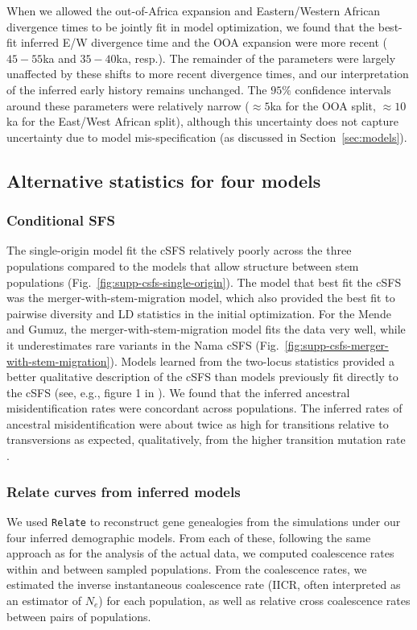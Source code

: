 \documentclass[]{article}
\newcommand{\Relate}{\texttt{Relate}\xspace}
\begin{document}
When we allowed the out-of-Africa expansion and Eastern/Western African
divergence times to be jointly fit in model optimization, we found that the
best-fit inferred E/W divergence time and the OOA expansion were more recent
($45-55$ka and $35-40$ka, resp.). The remainder of the parameters were largely
unaffected by these shifts to more recent divergence times, and our
interpretation of the inferred early history remains unchanged. The $95\%$
confidence intervals around these parameters were relatively narrow ($\approx
5$ka for the OOA split, $\approx 10$ka for the East/West African split),
although this uncertainty does not capture uncertainty due to model
mis-specification (as discussed in Section~\ref{sec:models}).

\subsection{Alternative statistics for four models}

\subsubsection{Conditional SFS}
\label{sec:cSFS}
The single-origin model fit the cSFS relatively poorly across the three
populations compared to the models that allow structure between stem
populations (Fig.~\ref{fig:supp-csfs-single-origin}). The model that best fit
the cSFS was the merger-with-stem-migration model, which also provided the best
fit to pairwise diversity and LD statistics in the initial optimization. For
the Mende and Gumuz, the merger-with-stem-migration model fits the data very
well, while it underestimates rare variants in the Nama cSFS
(Fig.~\ref{fig:supp-csfs-merger-with-stem-migration}). Models learned from the
two-locus statistics provided a better qualitative description of the cSFS than
models previously fit directly to the cSFS  (see, e.g., figure 1 in
\citet{Durvasula2020-td}). We found that the inferred ancestral
misidentification rates were concordant across populations. The inferred rates
of ancestral misidentification were about twice as high for transitions
relative to transversions as expected, qualitatively, from the higher
transition mutation rate \citep{Hernandez2007-mf}.

\subsubsection{Relate curves from inferred models}
\label{inferred_relate}
We used \Relate \citep{Speidel2019-nj} to reconstruct gene genealogies from the
simulations under our four inferred demographic models. From each of these,
following the same approach as for the analysis of the actual data, we computed
coalescence rates within and between sampled populations. From the coalescence
rates, we estimated the inverse instantaneous coalescence rate (IICR, often
interpreted as an estimator of $N_e$) for each population, as well as relative
cross coalescence rates between pairs of populations.
\end{document}
